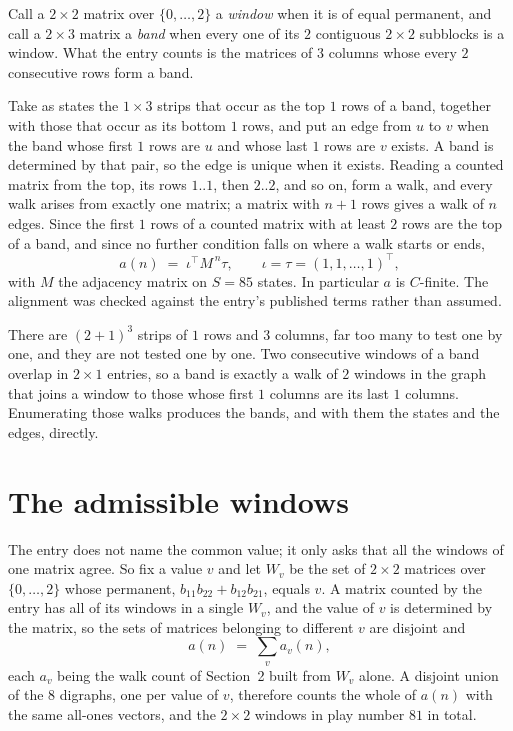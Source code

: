 \documentclass[11pt,a4paper]{article}
\theoremstyle{plain}
\theoremstyle{definition}
\begin{document}
Call a $2\times2$ matrix over $\{0,\dots,2\}$ a \emph{window} when it is of equal permanent, and
call a $2\times3$ matrix a \emph{band} when every one of its $2$ contiguous
$2\times2$ subblocks is a window. What the entry counts is the matrices of $3$ columns
whose every $2$ consecutive rows form a band.

Take as states the $1\times3$ strips that occur as the top $1$ rows of a band,
together with those that occur as its bottom $1$ rows, and put an edge from $u$ to $v$
when the band whose first $1$ rows are $u$ and whose last $1$ rows are $v$ exists.
A band is determined by that pair, so the edge is unique when it exists. Reading a counted
matrix from the top, its rows $1..1$, then $2..2$, and so on, form a walk, and every
walk arises from exactly one matrix; a matrix with $n+1$ rows gives a walk of $n$ edges.
Since the first $1$ rows of a counted matrix with at least $2$ rows are the top of a
band, and since no further condition falls on where a walk starts or ends,
\[
a(n)\;=\;\iota^{\!\top}M^{\,n}\tau ,\qquad \iota=\tau=(1,1,\dots,1)^{\!\top},
\]
with $M$ the adjacency matrix on $S=85$ states. In particular $a$ is $C$-finite. The
alignment was checked against the entry's published terms rather than assumed.

There are $(2 + 1)^{3}$ strips of $1$ rows and $3$ columns, far too
many to test one by one, and they are not tested one by one. Two consecutive windows of a band
overlap in $2\times1$ entries, so a band is exactly a walk of $2$ windows in
the graph that joins a window to those whose first $1$ columns are its last $1$
columns. Enumerating those walks produces the bands, and with them the states and the edges,
directly.

\section{The admissible windows}

The entry does not name the common value; it only asks that all the windows of one matrix agree.
So fix a value $v$ and let $W_v$ be the set of $2\times2$ matrices over
$\{0,\dots,2\}$ whose permanent, $b_{11}b_{22}+b_{12}b_{21}$, equals $v$. A matrix counted by the entry has all of
its windows in a single $W_v$, and the value of $v$ is determined by the matrix, so the sets of
matrices belonging to different $v$ are disjoint and
\[
a(n)\;=\;\sum_v a_v(n),
\]
each $a_v$ being the walk count of Section~2 built from $W_v$ alone. A disjoint union of the
$8$ digraphs, one per value of $v$, therefore counts the whole of $a(n)$ with the same
all-ones vectors, and the $2\times2$ windows in play number $81$ in total.
\end{document}
